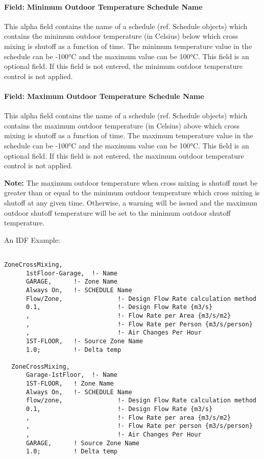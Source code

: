 \paragraph{Field: Minimum Outdoor Temperature Schedule Name}\label{field-minimum-outdoor-temperature-schedule-name-3}

This alpha field contains the name of a schedule (ref. Schedule objects) which contains the minimum outdoor temperature (in Celsius) below which cross mixing is shutoff as a function of time. The minimum temperature value in the schedule can be -100°C and the maximum value can be 100°C. This field is an optional field. If this field is not entered, the minimum outdoor temperature control is not applied.

\paragraph{Field: Maximum Outdoor Temperature Schedule Name}\label{field-maximum-outdoor-temperature-schedule-name-3}

This alpha field contains the name of a schedule (ref. Schedule objects) which contains the maximum outdoor temperature (in Celsius) above which cross mixing is shutoff as a function of time. The maximum temperature value in the schedule can be -100°C and the maximum value can be 100°C. This field is an optional field. If this field is not entered, the maximum outdoor temperature control is not applied.

\textbf{Note:} The maximum outdoor temperature when cross mixing is shutoff must be greater than or equal to the minimum outdoor temperature which cross mixing is shutoff at any given time. Otherwise, a warning will be issued and the maximum outdoor shutoff temperature will be set to the minimum outdoor shutoff temperature.

An IDF Example:

\begin{lstlisting}

ZoneCrossMixing,
      1stFloor-Garage,  !- Name
      GARAGE,      !- Zone Name
      Always On,   !- SCHEDULE Name
      Flow/Zone,               !- Design Flow Rate calculation method
      0.1,                     !- Design Flow Rate {m3/s}
      ,                        !- Flow Rate per Area {m3/s/m2}
      ,                        !- Flow Rate per Person {m3/s/person}
      ,                        !- Air Changes Per Hour
      1ST-FLOOR,   !- Source Zone Name
      1.0;         !- Delta temp

  ZoneCrossMixing,
      Garage-1stFloor,  !- Name
      1ST-FLOOR,   ! Zone Name
      Always On,   !- SCHEDULE Name
      flow/zone,               !- Design Flow Rate calculation method
      0.1,                     !- Design Flow Rate {m3/s}
      ,                        !- Flow Rate per area {m3/s/m2}
      ,                        !- Flow Rate per person {m3/s/person}
      ,                        !- Air Changes Per Hour
      GARAGE,      ! Source Zone Name
      1.0;         ! Delta temp
\end{lstlisting}

